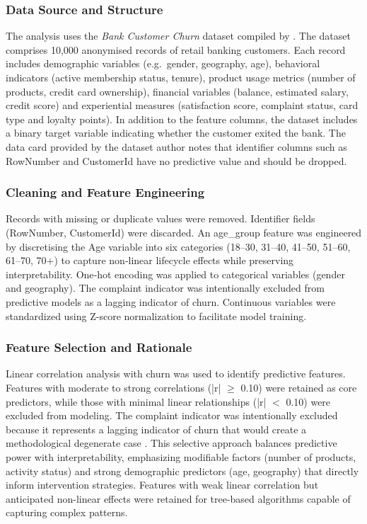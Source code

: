 \documentclass[12pt]{article}
\begin{document}
\subsubsection{Data Source and Structure}
The analysis uses the \emph{Bank Customer Churn} dataset compiled by \citet{kollipara2022bank}.  The dataset comprises 10,000 anonymised records of retail banking customers.  Each record includes demographic variables (e.g.\ gender, geography, age), behavioral indicators (active membership status, tenure), product usage metrics (number of products, credit card ownership), financial variables (balance, estimated salary, credit score) and experiential measures (satisfaction score, complaint status, card type and loyalty points).  In addition to the feature columns, the dataset includes a binary target variable indicating whether the customer exited the bank.  The data card provided by the dataset author notes that identifier columns such as RowNumber and CustomerId have no predictive value and should be dropped.

\subsubsection{Cleaning and Feature Engineering}
Records with missing or duplicate values were removed. Identifier fields (RowNumber, CustomerId) were discarded. An age\_group feature was engineered by discretising the Age variable into six categories (18–30, 31–40, 41–50, 51–60, 61–70, 70+) to capture non‑linear lifecycle effects while preserving interpretability. One‑hot encoding was applied to categorical variables (gender and geography). The complaint indicator was intentionally excluded from predictive models as a lagging indicator of churn. Continuous variables were standardized using Z-score normalization to facilitate model training.

\subsubsection{Feature Selection and Rationale}
Linear correlation analysis with churn was used to identify predictive features. Features with moderate to strong correlations (|r| $\geq$ 0.10) were retained as core predictors, while those with minimal linear relationships (|r| $<$ 0.10) were excluded from modeling. The complaint indicator was intentionally excluded because it represents a lagging indicator of churn that would create a methodological degenerate case \citep{kumar2022customerretention}. This selective approach balances predictive power with interpretability, emphasizing modifiable factors (number of products, activity status) and strong demographic predictors (age, geography) that directly inform intervention strategies. Features with weak linear correlation but anticipated non-linear effects were retained for tree-based algorithms capable of capturing complex patterns.
\end{document}

